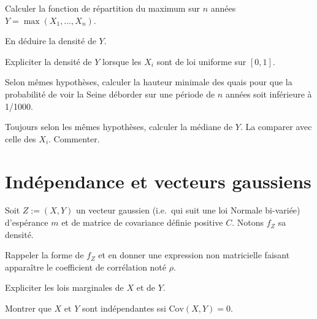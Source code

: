 \label{II-crue1}
Calculer la fonction de répartition du maximum sur \(n\) années
\(Y = \max(X_1,\ldots,X_n)\).

\label{II-crue2}
En déduire la densité de \(Y\).

\label{II-crue3}
Expliciter la densité de \(Y\) lorsque les \(X_i\) sont de loi uniforme
sur \([0,1]\).

\label{II-crue4}
Selon mêmes hypothèses, calculer la hauteur minimale des quais pour que
la probabilité de voir la Seine déborder sur une période de \(n\) années
soit inférieure à 1/1000.

\label{II-crue5}
Toujours selon les mêmes hypothèses, calculer la médiane de \(Y\). La
comparer avec celle des \(X_i\). Commenter.

\section{Indépendance et vecteurs
gaussiens}\label{II-induxe9pendance-et-vecteurs-gaussiens}

Soit \(Z := (X,Y)\) un vecteur gaussien (i.e.~qui suit une loi Normale
bi-variée) d'espérance \(m\) et de matrice de covariance définie
positive \(C\). Notons \(f_Z\) sa densité.

\label{II-covindepgauss-joint}
Rappeler la forme de \(f_Z\) et en donner une expression non matricielle
faisant apparaître le coefficient de corrélation noté
\(\rho\).

\label{II-covindepgauss-marg}
Expliciter les lois marginales de \(X\) et de
\(Y\).

\label{II-covindepgauss-indep}
Montrer que \(X\) et \(Y\) sont indépendantes ssi
\(\text{Cov}\left(X,Y\right) = 0\).

